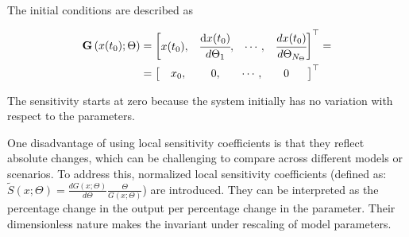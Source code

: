 \documentclass[a4paper,fleqn]{cas-dc}
\begin{document}
	The initial conditions are described as
	
	{\footnotesize
		\begin{align}
			{\textbf{G}}\left(x(t_0);\Theta\right)  	   &= 
			\begin{bmatrix}
				x(t_0),						               &
				\cfrac{ \text{d}x(t_0) }{ d{\Theta_1} },   &
				\cdots,					 				   &
				\cfrac{ dx(t_0) }{ d{\Theta_{N_\Theta}} }            
			\end{bmatrix}^\top = \\ 					   &=
			\begin{bmatrix} 
				\quad x_0,	                               &
				\quad ~0,		                           &
				\quad \cdots,			                   &
				\quad 0 \quad~~
			\end{bmatrix}^\top \nonumber
	\end{align} }

	{\color{blue} The sensitivity starts at zero because the system initially has no variation with respect to the parameters.}
	
	One disadvantage of using local sensitivity coefficients is that they reflect absolute changes, which can be challenging to compare across different models or scenarios. To address this, normalized local sensitivity coefficients (defined as: $\tilde{S}(x;\Theta) = \frac{d G(x;\Theta)}{d\Theta} \frac{\Theta}{G(x;\Theta)}$) are introduced. They can be interpreted as the percentage change in the output per percentage change in the parameter. Their dimensionless nature makes the invariant under rescaling of model parameters.
	
	
\end{document}
